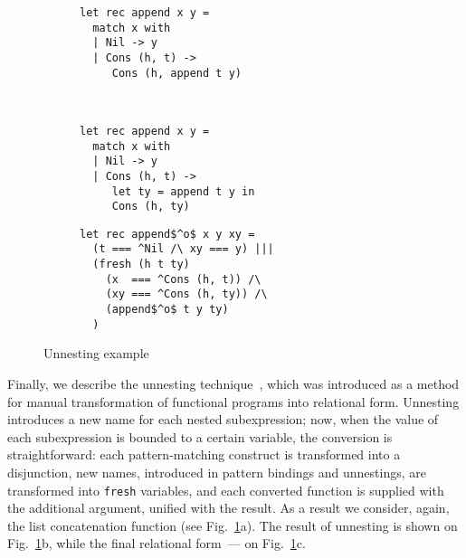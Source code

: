 \begin{figure}[t]
  \centering
  \begin{subfigure}[t]{0.4\textwidth}
    \centering
\begin{lstlisting}
let rec append x y =
  match x with
  | Nil -> y
  | Cons (h, t) ->
     Cons (h, append t y)     
\end{lstlisting}
\caption{}
  \end{subfigure}
  ~
  \begin{subfigure}[t]{0.4\textwidth}
        \centering
\begin{lstlisting}
let rec append x y =
  match x with 
  | Nil -> y
  | Cons (h, t) -> 
     let ty = append t y in
     Cons (h, ty)
\end{lstlisting}
\vspace{-1\baselineskip}
\caption{}
  \end{subfigure}
  \vskip2mm
  \begin{subfigure}[t]{0.4\textwidth}
        \centering
\begin{lstlisting}
let rec append$^o$ x y xy =
  (t === ^Nil /\ xy === y) |||
  (fresh (h t ty)
    (x  === ^Cons (h, t)) /\
    (xy === ^Cons (h, ty)) /\
    (append$^o$ t y ty)
  )
\end{lstlisting}
\vspace{-1\baselineskip}
\caption{}
  \end{subfigure}
  \vskip4mm
\caption{Unnesting example}
\label{unnesting_example}
\end{figure}

Finally, we describe the unnesting technique~\cite{TRS}, which was introduced as a method for manual transformation
of functional programs into relational form. Unnesting introduces a new name for each nested subexpression; now, when the value of
each subexpression is bounded to a certain variable, the conversion is straightforward: each pattern-matching construct is
transformed into a disjunction, new names, introduced in pattern bindings and unnestings, are transformed into \lstinline|fresh| variables, and
each converted function is supplied with the additional argument, unified with the result. As a result we consider, again, the list
concatenation function (see Fig.~\ref{unnesting_example}a). The result of unnesting is shown on Fig.~\ref{unnesting_example}b, while the
final relational form~--- on Fig.~\ref{unnesting_example}c.

